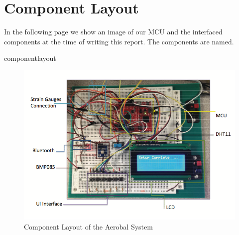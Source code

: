 \section{Component Layout}

In the following page we show an image of our MCU and the interfaced components at the time of writing this report. The components are named. 


componentlayout
\begin{figure}[H]
	\centering
		\includegraphics[scale=0.5]{img/componentlayout}
	\caption{Component Layout of the Aerobal System}
\end{figure}
